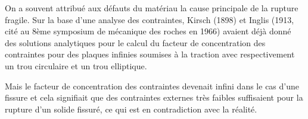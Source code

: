 \medskip
\begin{histoire}%
On a souvent attribué aux défauts du matériau la cause principale de la rupture fragile. 
Sur la base d'une analyse des contraintes, Kirsch (1898) et 
Inglis (1913, cité au 8ème symposium  de mécanique des roches en 1966) 
avaient déjà donné des solutions analytiques pour le calcul du facteur de concentration des 
contraintes pour des plaques infinies soumises à la traction avec respectivement un trou circulaire 
et un trou elliptique. 

\medskip
Mais le facteur de concentration des contraintes devenait infini dans le cas d'une fissure et cela signifiait 
que des contraintes externes très faibles suffisaient pour la rupture d'un solide fissuré, ce qui est en 
contradiction avec la réalité.
\end{histoire}

